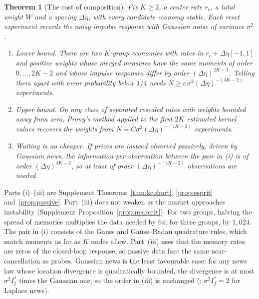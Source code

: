 \documentclass[12pt]{article}
\newtheorem{theorem}{Theorem}[section]
\theoremstyle{definition}
\theoremstyle{remark}
\begin{document}
\begin{theorem}[The cost of composition]\label{n:cost}
Fix $K\ge2$, a center rate $r_c$, a total weight $W$ and a spacing $\Delta\eta$, with every candidate economy stable. Each reset experiment records the noisy impulse response with Gaussian noise of variance $\sigma^2$.
\begin{enumerate}[label=(\roman*),itemsep=1pt]
\item \emph{Lower bound.} There are two $K$-group economies with rates in $r_c+\Delta\eta[-1,1]$ and positive weights whose merged measures have the same moments of order $0,\ldots,2K-2$ and whose impulse responses differ by order $(\Delta\eta)^{2K-1}$. Telling them apart with error probability below $1/4$ needs $N\ge c\,\sigma^2(\Delta\eta)^{-(4K-2)}$ experiments.
\item \emph{Upper bound.} On any class of separated rescaled rates with weights bounded away from zero, Prony's method applied to the first $2K$ estimated kernel values recovers the weights from $N=C\sigma^2(\Delta\eta)^{-(4K-2)}$ experiments.
\item \emph{Waiting is no cheaper.} If prices are instead observed passively, driven by Gaussian news, the information per observation between the pair in (i) is of order $(\Delta\eta)^{4K-2}$, so at least of order $(\Delta\eta)^{-(4K-2)}$ observations are needed.
\end{enumerate}
\end{theorem}

Parts (i)--(iii) are Supplement Theorems~\ref{thm:kcohort}, \ref{prop:esprit} and~\ref{prop:passive}. Part~(iii) does not weaken as the market approaches instability (Supplement Proposition~\ref{prop:nearcrit}). For two groups, halving the spread of memories multiplies the data needed by $64$; for three groups, by $1{,}024$. The pair in (i) consists of the Gauss and Gauss--Radau quadrature rules, which match moments as far as $K$ nodes allow. Part~(iii) uses that the memory rates are zeros of the closed-loop response, so passive data face the same near-cancellation as probes. Gaussian news is the least favourable case: for any news law whose location divergence is quadratically bounded, the divergence is at most $\sigma^2I^*_f$ times the Gaussian one, so the order in (iii) is unchanged (\citealp[Proposition~S16.2]{niroula2026full}; $\sigma^2I^*_f=2$ for Laplace news).
\end{document}
